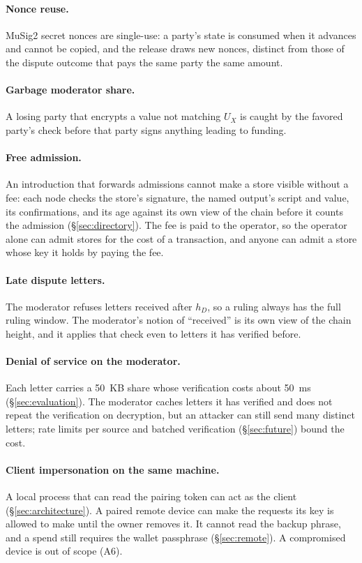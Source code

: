 \paragraph{Nonce reuse.} MuSig2 secret nonces are single-use: a party's state is consumed when it advances and cannot be copied, and the release draws new nonces, distinct from those of the dispute outcome that pays the same party the same amount.

\paragraph{Garbage moderator share.} A losing party that encrypts a value not matching $U_X$ is caught by the favored party's check before that party signs anything leading to funding.

\paragraph{Free admission.} An introduction that forwards admissions cannot make a store visible without a fee: each node checks the store's signature, the named output's script and value, its confirmations, and its age against its own view of the chain before it counts the admission (\S\ref{sec:directory}). The fee is paid to the operator, so the operator alone can admit stores for the cost of a transaction, and anyone can admit a store whose key it holds by paying the fee.

\paragraph{Late dispute letters.} The moderator refuses letters received after $h_D$, so a ruling always has the full ruling window. The moderator's notion of ``received'' is its own view of the chain height, and it applies that check even to letters it has verified before.

\paragraph{Denial of service on the moderator.} Each letter carries a 50~KB share whose verification costs about 50~ms (\S\ref{sec:evaluation}). The moderator caches letters it has verified and does not repeat the verification on decryption, but an attacker can still send many distinct letters; rate limits per source and batched verification (\S\ref{sec:future}) bound the cost.

\paragraph{Client impersonation on the same machine.} A local process that can read the pairing token can act as the client (\S\ref{sec:architecture}). A paired remote device can make the requests its key is allowed to make until the owner removes it. It cannot read the backup phrase, and a spend still requires the wallet passphrase (\S\ref{sec:remote}). A compromised device is out of scope (A6).
